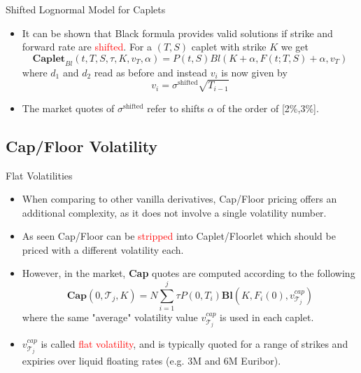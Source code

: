 \documentclass{beamer}
\begin{document}
\begin{frame}{Shifted Lognormal Model for Caplets}
\begin{itemize}
	\item It can be shown that Black formula provides valid solutions if strike and forward rate are \textcolor{red}{shifted}. For a $(T,S)$ caplet with strike $K$ we get
	\begin{equation}
		\textbf{Caplet}_{Bl}(t,T,S,\tau,K,v_T,\alpha) = P(t,S) Bl(K+\alpha,F(t;T,S)+\alpha,v_T)
	\end{equation}
	where $d_1$ and $d_2$ read as before and instead $v_i$ is now given by
	\begin{equation*}
		v_i = \sigma^{\text{shifted}}\sqrt{T_{i-1}}
	\end{equation*}
	\item The market quotes of $\sigma^{\text{shifted}}$ refer to shifts $\alpha$ of the order of [2\%,3\%].
\end{itemize}
\end{frame}

\subsection{Cap/Floor Volatility}
\begin{frame}{Flat Volatilities}
	\begin{itemize}
		\item When comparing to other vanilla derivatives, Cap/Floor pricing offers an additional complexity, as it does not involve a single volatility number. 
		\item As seen Cap/Floor can be \textcolor{red}{stripped} into Caplet/Floorlet which should be priced with a different volatility each. 
		\item However, in the market, \textbf{Cap} quotes are computed according to the following 
		\begin{equation*}
			\textbf{Cap}(0,\mathcal{T}_j,K)=N\sum_{i=1}^{j}\tau P(0,T_i) \textbf{Bl}(K,F_i(0),v_{\mathcal{T}_j}^{cap})
		\end{equation*}
		where the same "average" volatility value $v_{\mathcal{T}_j}^{cap}$ is used in each caplet. 
		\item $v_{\mathcal{T}_j}^{cap}$ is called \textcolor{red}{flat volatility}, and is typically quoted for a range of strikes and expiries over liquid floating rates (e.g. 3M and 6M Euribor).
	\end{itemize}
\end{frame}
\end{document}
